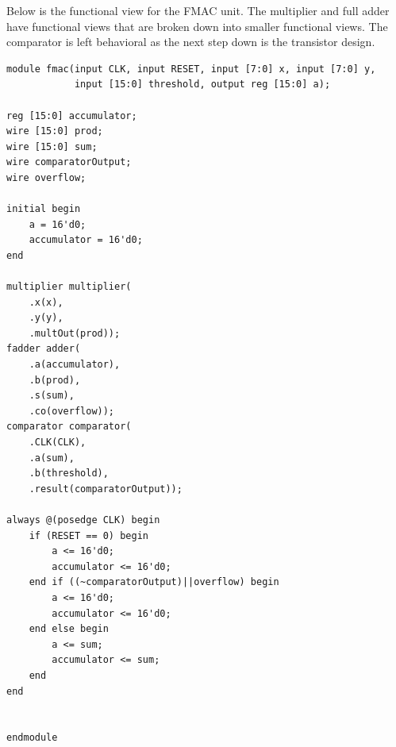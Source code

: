 \documentclass{memo}
\begin{document}
Below is the functional view for the FMAC unit. The multiplier and full adder have functional views that are broken down into smaller functional views. The comparator is left behavioral as the next step down is the transistor design.
\begin{lstlisting}
module fmac(input CLK, input RESET, input [7:0] x, input [7:0] y,
            input [15:0] threshold, output reg [15:0] a);

reg [15:0] accumulator;
wire [15:0] prod;
wire [15:0] sum;
wire comparatorOutput;
wire overflow;

initial begin
    a = 16'd0;
    accumulator = 16'd0;
end

multiplier multiplier(
    .x(x),
    .y(y),
    .multOut(prod));
fadder adder(
    .a(accumulator),
    .b(prod),
    .s(sum),
    .co(overflow));
comparator comparator(
    .CLK(CLK),
    .a(sum),
    .b(threshold),
    .result(comparatorOutput));

always @(posedge CLK) begin
    if (RESET == 0) begin
        a <= 16'd0;
        accumulator <= 16'd0;
    end if ((~comparatorOutput)||overflow) begin
        a <= 16'd0;
        accumulator <= 16'd0;
    end else begin
        a <= sum;
        accumulator <= sum;
    end
end


endmodule
\end{lstlisting}
\end{document}
